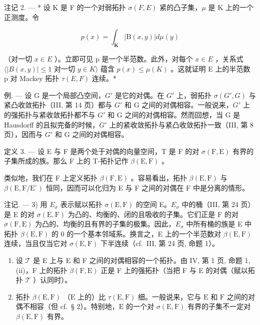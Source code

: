 注记 2. --- * 设 K 是 F 的一个对弱拓扑 \(\sigma(F, E)\) 紧的凸子集，\(\mu\) 是 K 上的一个正测度。令

\[
p (x) = \int_ {\mathbf {K}} | \mathrm{B} (x, y) | d \mu (y)
\]

（对一切 \(x \in E\) ）。立即可见 p 是一个半范数。此外，对每个 \(x \in E\) ，关系式 \(\langle |B(x, y)| \leqslant 1 \text{ 对一切 } y \in K \rangle\) 蕴含 \(p(x) \leqslant \mu(K)\) 。这就证明 E 上的半范数 p 对 Mackey 拓扑 \(\tau(E, F)\) 连续。*

例. --- 设 G 是一个局部凸空间，\(G'\) 是它的对偶。在 \(G'\) 上，弱拓扑 \(\sigma(G', G)\) 与紧凸收敛拓扑（III, 第 14 页）都与 \(G'\) 和 G 之间的对偶相容。一般说来，\(G'\) 上的强拓扑与紧收敛拓扑都不与 \(G'\) 和 G 之间的对偶相容。然而回想，当 G 是 Hausdorff 的且拟完备的时候，\(G'\) 上的紧收敛拓扑与紧凸收敛拓扑一致（III, 第 8 页），因而与 \(G'\) 和 G 之间的对偶相容。

定义 3. --- 设 E 与 F 是两个处于对偶的向量空间，T 是 F 的对 \(\sigma(\mathrm{F}, \mathrm{E})\) 有界的子集所成的族。那么 F 上的 T-拓扑记作 \(\beta(\mathrm{E}, \mathrm{F})\) 。

类似地，我们在 F 上定义拓扑 \(\beta(\mathrm{F},\mathrm{E})\) 。容易看出，拓扑 \(\beta(\mathrm{E},\mathrm{F})\) 与 \(\beta(\mathrm{E},\mathrm{F}/\mathrm{E}^{\circ})\) 恒同，因而可以化归为 E 与 F 之间的对偶在 F 中是分离的情形。

注记. --- 3) 用 \(E_{\sigma}\) 表示赋以拓扑 \(\sigma(\mathrm{E}, \mathrm{F})\) 的空间 E。\(E_{\sigma}\) 中的桶（III, 第 24 页）是 E 的对 \(\sigma(\mathrm{E}, \mathrm{F})\) 为凸的、均衡的、闭的且吸收的子集。它们正是 F 的对 \(\sigma(\mathrm{F}, \mathrm{E})\) 为凸的、均衡的且有界的子集的极集。因此，\(E_{\sigma}\) 中所有桶的族是 E 中拓扑 \(\beta(\mathrm{E}, \mathrm{F})\) 的 0 的一个基本邻域系。换言之，E 上的一个半范数对 \(\beta(\mathrm{E}, \mathrm{F})\) 连续，当且仅当它对 \(\sigma(\mathrm{E}, \mathrm{F})\) 下半连续（cf.~III, 第 24 页, 命题 1）。

\begin{enumerate}
\def\labelenumi{\arabic{enumi})}
\setcounter{enumi}{3}
\item
  设 \(\mathcal{T}\) 是 E 上与 E 和 F 之间的对偶相容的一个拓扑。由 IV, 第 1 页, 命题 1, (ii)，F 上的拓扑 \(\beta(\mathrm{F},\mathrm{E})\) 正是 F 上的强拓扑（当把 F 与 E 的对偶（赋以拓扑 \(\mathcal{T}\) ）认同时）。
\item
  拓扑 \(\beta(\mathrm{E},\mathrm{F})\) （\(\mathrm{E}\) 上的）比 \(\tau(\mathrm{E},\mathrm{F})\) 细。一般说来，它与 \(\mathrm{E}\) 和 \(\mathrm{F}\) 之间的对偶不相容（但 cf.~§ 2）。特别地，\(\mathrm{E}\) 的一个对 \(\sigma(\mathrm{E},\mathrm{F})\) 有界的子集不一定对 \(\beta(\mathrm{E},\mathrm{F})\) 有界。
\end{enumerate}

